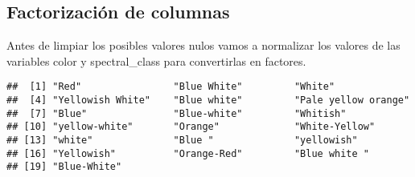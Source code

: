 \documentclass[
]{article}
\newenvironment{Shaded}{\begin{snugshade}}{\end{snugshade}}
\newcommand{\CommentTok}[1]{\textcolor[rgb]{0.50,0.62,0.50}{#1}}
\newcommand{\FunctionTok}[1]{\textcolor[rgb]{0.94,0.94,0.56}{#1}}
\newcommand{\NormalTok}[1]{\textcolor[rgb]{0.80,0.80,0.80}{#1}}
\newcommand{\SpecialCharTok}[1]{\textcolor[rgb]{0.86,0.64,0.64}{#1}}
\begin{document}
\hypertarget{factorizaciuxf3n-de-columnas}{%
\subsection{Factorización de
columnas}\label{factorizaciuxf3n-de-columnas}}

Antes de limpiar los posibles valores nulos vamos a normalizar los
valores de las variables color y spectral\_class para convertirlas en
factores.

\begin{Shaded}
\end{Shaded}

\begin{verbatim}
##  [1] "Red"                "Blue White"         "White"             
##  [4] "Yellowish White"    "Blue white"         "Pale yellow orange"
##  [7] "Blue"               "Blue-white"         "Whitish"           
## [10] "yellow-white"       "Orange"             "White-Yellow"      
## [13] "white"              "Blue "              "yellowish"         
## [16] "Yellowish"          "Orange-Red"         "Blue white "       
## [19] "Blue-White"
\end{verbatim}
\end{document}
